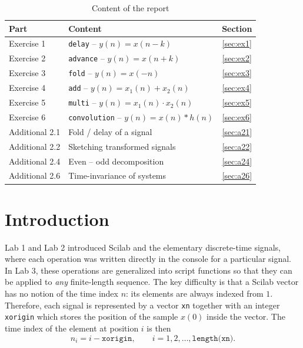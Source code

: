 \documentclass[12pt,a4paper]{article}
\begin{document}
\begin{table}[H]
    \centering
    \caption{Content of the report}
    \begin{tabular}{|l|l|c|}
        \hline
        \rowcolor{headergray}\textbf{Part} & \textbf{Content} & \textbf{Section} \\ \hline
        Exercise 1 & \texttt{delay} -- $y(n)=x(n-k)$                   & \ref{sec:ex1} \\ \hline
        Exercise 2 & \texttt{advance} -- $y(n)=x(n+k)$                 & \ref{sec:ex2} \\ \hline
        Exercise 3 & \texttt{fold} -- $y(n)=x(-n)$                     & \ref{sec:ex3} \\ \hline
        Exercise 4 & \texttt{add} -- $y(n)=x_1(n)+x_2(n)$              & \ref{sec:ex4} \\ \hline
        Exercise 5 & \texttt{multi} -- $y(n)=x_1(n)\cdot x_2(n)$       & \ref{sec:ex5} \\ \hline
        Exercise 6 & \texttt{convolution} -- $y(n)=x(n)*h(n)$          & \ref{sec:ex6} \\ \hline
        Additional 2.1 & Fold / delay of a signal                      & \ref{sec:a21} \\ \hline
        Additional 2.2 & Sketching transformed signals                 & \ref{sec:a22} \\ \hline
        Additional 2.4 & Even -- odd decomposition                     & \ref{sec:a24} \\ \hline
        Additional 2.6 & Time-invariance of systems                    & \ref{sec:a26} \\ \hline
    \end{tabular}
\end{table}

\section{Introduction}
Lab 1 and Lab 2 introduced Scilab and the elementary discrete-time signals, where each operation was written directly in the console for a particular signal. In Lab 3, these operations are generalized into script functions so that they can be applied to \emph{any} finite-length sequence. The key difficulty is that a Scilab vector has no notion of the time index $n$: its elements are always indexed from $1$. Therefore, each signal is represented by a vector \texttt{xn} together with an integer \texttt{xorigin} which stores the position of the sample $x(0)$ inside the vector. The time index of the element at position $i$ is then
\begin{equation}
    n_i = i - \texttt{xorigin}, \qquad i = 1, 2, \dots, \texttt{length(xn)}.
    \label{eq:index}
\end{equation}
\end{document}
